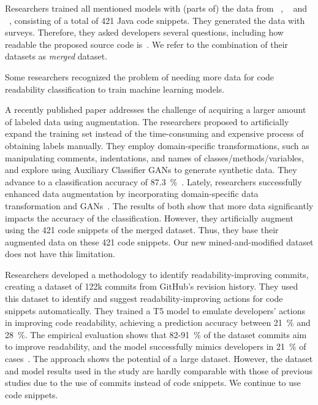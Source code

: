 \documentclass[%
class=scrreprt,
chapterprefix=false,%
open=right,%
twoside=true,%
paper=a4,%
logofile={Logo\_zentral\_farbig\_EN.png},%
thesistype=master,%
UKenglish,%
]{se2thesis}
\theoremstyle{definition}
\newcommand{\numMerged}{421\xspace}
\begin{document}
	Researchers trained all mentioned models with (parts of) the data from \citeauthor{buse2009learning}~\cite{buse2009learning}, \citeauthor{dorn2012general}~\cite{dorn2012general} and \citeauthor{scalabrino2018comprehensive}~\cite{scalabrino2018comprehensive}, consisting of a total of \numMerged Java code snippets. They generated the data with surveys. Therefore, they asked developers several questions, including how readable the proposed source code is~\cite{buse2009learning, dorn2012general, scalabrino2018comprehensive}. We refer to the combination of their datasets as \textit{merged} dataset.
	
	Some researchers recognized the problem of needing more data for code readability classification to train machine learning models.
					
	A recently published paper addresses the challenge of acquiring a larger amount of labeled data using augmentation. The researchers proposed to artificially expand the training set instead of the time-consuming and expensive process of obtaining labels manually. They employ domain-specific transformations, such as manipulating comments, indentations, and names of classes/methods/variables, and explore using Auxiliary Classifier GANs to generate synthetic data. They advance to a classification accuracy of 87.3~\%~\cite{mi2021effectiveness}.
	Lately, researchers successfully enhanced data augmentation by incorporating domain-specific data transformation and GANs~\cite{mi2022enhanced}.
	The results of both show that more data significantly impacts the accuracy of the classification. However, they artificially augment using the \numMerged code snippets of the merged dataset. Thus, they base their augmented data on these \numMerged code snippets. Our new mined-and-modified dataset does not have this limitation.
	
	Researchers developed a methodology to identify readability-improving commits, creating a dataset of 122k commits from GitHub's revision history. They used this dataset to identify and suggest readability-improving actions for code snippets automatically. They trained a T5 model to emulate developers' actions in improving code readability, achieving a prediction accuracy between 21~\% and 28~\%. The empirical evaluation shows that 82-91~\% of the dataset commits aim to improve readability, and the model successfully mimics developers in 21~\% of cases~\cite{vitale2023using}.
	The approach shows the potential of a large dataset. However, the dataset and model results used in the study are hardly comparable with those of previous studies due to the use of commits instead of code snippets. We continue to use code snippets.
		
\end{document}
